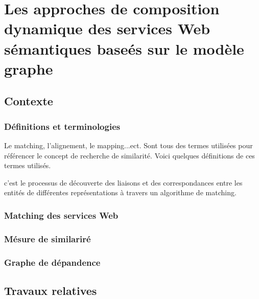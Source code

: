 \chapter{Les approches de composition dynamique des services Web sémantiques baseés sur le modèle graphe}
\newpage
\section{Contexte}
  \subsection{Définitions et terminologies}
  \label{sec:defin-et-term}
  Le matching, l'alignement, le mapping...ect. Sont tous des termes
  utilisées pour référencer le concept de recherche de
  similarité. Voici quelques définitions de ces termes utilisés.

  \begin{mydef}[Matching]
    c'est le processus de découverte des liaisons et des
    correspondances entre les entités de différentes représentations à
    travers un algorithme de matching.
  \end{mydef}

  \subsection{Matching des services Web}
  \label{sec:match-des-serv}

  \subsection{Mésure de similariré}
  \label{sec:mesure-de-similarire}

  \subsection{Graphe de dépandence}
  \label{sec:graph-de-depandence}

\section{Travaux relatives}
\label{sec:travaux-relatives}


